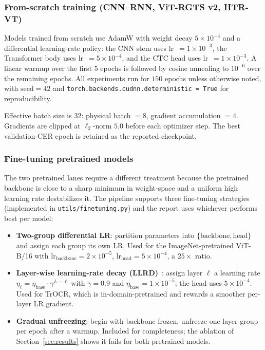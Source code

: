 \subsubsection{From-scratch training (CNN--RNN, ViT-RGTS v2, HTR-VT)}

Models trained from scratch use AdamW with weight decay $5 \times 10^{-4}$ and a differential learning-rate policy: the CNN stem uses lr~$= 1 \times 10^{-3}$, the Transformer body uses lr~$= 5 \times 10^{-4}$, and the CTC head uses lr~$= 1 \times 10^{-3}$. A linear warmup over the first $5$ epochs is followed by cosine annealing to $10^{-6}$ over the remaining epochs. All experiments run for $150$ epochs unless otherwise noted, with $\mathrm{seed} = 42$ and \texttt{torch.backends.cudnn.deterministic = True} for reproducibility.

Effective batch size is $32$: physical batch $= 8$, gradient accumulation $= 4$. Gradients are clipped at $\ell_2$-norm $5.0$ before each optimizer step. The best validation-CER epoch is retained as the reported checkpoint.

\subsubsection{Fine-tuning pretrained models}
\label{sec:finetune}

The two pretrained lanes require a different treatment because the pretrained backbone is close to a sharp minimum in weight-space and a uniform high learning rate destabilizes it. The pipeline supports three fine-tuning strategies (implemented in \texttt{utils/finetuning.py}) and the report uses whichever performs best per model:

\begin{itemize}
    \item \textbf{Two-group differential LR}: partition parameters into $\{\mathrm{backbone}, \mathrm{head}\}$ and assign each group its own LR. Used for the ImageNet-pretrained ViT-B/16 with $\mathrm{lr}_{\mathrm{backbone}} = 2 \times 10^{-5}$, $\mathrm{lr}_{\mathrm{head}} = 5 \times 10^{-4}$, a $25 \times$ ratio.
    \item \textbf{Layer-wise learning-rate decay (LLRD)}~\cite{howard2018ulmfit}: assign layer $\ell$ a learning rate $\eta_{\ell} = \eta_{\mathrm{base}} \cdot \gamma^{L-\ell}$ with $\gamma = 0.9$ and $\eta_{\mathrm{base}} = 1 \times 10^{-5}$; the head uses $5 \times 10^{-4}$. Used for TrOCR, which is in-domain-pretrained and rewards a smoother per-layer LR gradient.
    \item \textbf{Gradual unfreezing}: begin with backbone frozen, unfreeze one layer group per epoch after a warmup. Included for completeness; the ablation of Section~\ref{sec:results} shows it fails for both pretrained models.
\end{itemize}

